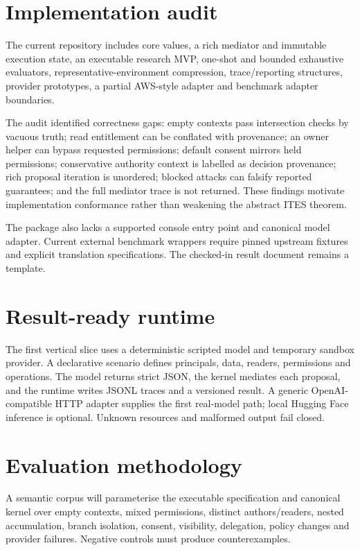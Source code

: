 \documentclass[11pt]{article}
\begin{document}
\section{Implementation audit}
The current repository includes core values, a rich mediator and immutable execution state, an executable research MVP, one-shot and bounded exhaustive evaluators, representative-environment compression, trace/reporting structures, provider prototypes, a partial AWS-style adapter and benchmark adapter boundaries.

The audit identified correctness gaps: empty contexts pass intersection checks by vacuous truth; read entitlement can be conflated with provenance; an owner helper can bypass requested permissions; default consent mirrors held permissions; conservative authority context is labelled as decision provenance; rich proposal iteration is unordered; blocked attacks can falsify reported guarantees; and the full mediator trace is not returned. These findings motivate implementation conformance rather than weakening the abstract ITES theorem.

The package also lacks a supported console entry point and canonical model adapter. Current external benchmark wrappers require pinned upstream fixtures and explicit translation specifications. The checked-in result document remains a template.

\section{Result-ready runtime}
The first vertical slice uses a deterministic scripted model and temporary sandbox provider. A declarative scenario defines principals, data, readers, permissions and operations. The model returns strict JSON, the kernel mediates each proposal, and the runtime writes JSONL traces and a versioned result. A generic OpenAI-compatible HTTP adapter supplies the first real-model path; local Hugging Face inference is optional. Unknown resources and malformed output fail closed.

\section{Evaluation methodology}
A semantic corpus will parameterise the executable specification and canonical kernel over empty contexts, mixed permissions, distinct authors/readers, nested accumulation, branch isolation, consent, visibility, delegation, policy changes and provider failures. Negative controls must produce counterexamples.
\end{document}
